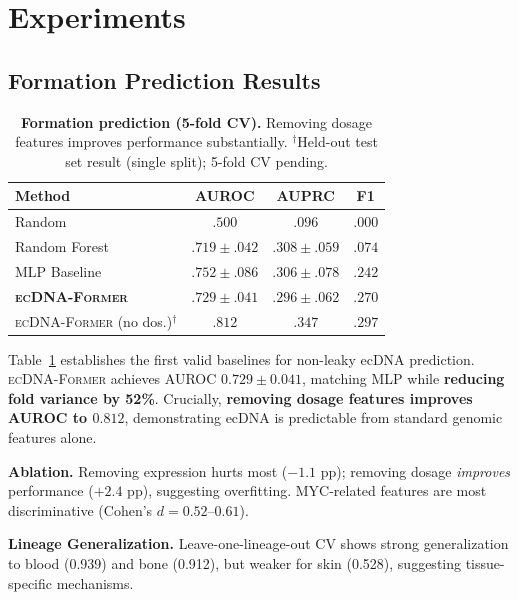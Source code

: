 \documentclass[sigconf,anonymous]{acmart}
\newcommand{\former}{\textsc{ecDNA-Former}}
\begin{document}
\section{Experiments}
\label{sec:experiments}

\subsection{Formation Prediction Results}

\begin{table}[t]
\caption{\textbf{Formation prediction (5-fold CV).} Removing dosage features improves performance substantially. $^\dagger$Held-out test set result (single split); 5-fold CV pending.}
\label{tab:formation}
\centering
\footnotesize
\begin{tabular}{@{}lccc@{}}
\toprule
Method & AUROC & AUPRC & F1 \\
\midrule
Random & $.500$ & $.096$ & $.000$ \\
Random Forest & $.719 \pm .042$ & $.308 \pm .059$ & $.074$ \\
MLP Baseline & $.752 \pm .086$ & $.306 \pm .078$ & $.242$ \\
\textbf{\former{}} & $.729 \pm .041$ & $\mathbf{.296 \pm .062}$ & $\mathbf{.270}$ \\
\former{} (no dos.)$^\dagger$ & $\mathbf{.812}$ & $.347$ & $.297$ \\
\bottomrule
\end{tabular}
\end{table}

Table~\ref{tab:formation} establishes the first valid baselines for non-leaky ecDNA prediction. \former{} achieves AUROC $0.729 \pm 0.041$, matching MLP while \textbf{reducing fold variance by 52\%}. Crucially, \textbf{removing dosage features improves AUROC to $0.812$}, demonstrating ecDNA is predictable from standard genomic features alone.

\textbf{Ablation.} Removing expression hurts most ($-1.1$ pp); removing dosage \textit{improves} performance ($+2.4$ pp), suggesting overfitting. MYC-related features are most discriminative (Cohen's $d = 0.52$--$0.61$).

\textbf{Lineage Generalization.} Leave-one-lineage-out CV shows strong generalization to blood (0.939) and bone (0.912), but weaker for skin (0.528), suggesting tissue-specific mechanisms.
\end{document}
